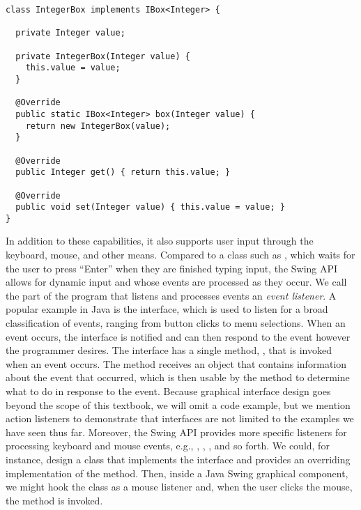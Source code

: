 \begin{lstlisting}[language=MyJava]
class IntegerBox implements IBox<Integer> {
  
  private Integer value;
  
  private IntegerBox(Integer value) { 
    this.value = value; 
  }
  
  @Override
  public static IBox<Integer> box(Integer value) { 
    return new IntegerBox(value); 
  }
  
  @Override
  public Integer get() { return this.value; }
  
  @Override
  public void set(Integer value) { this.value = value; }
}
\end{lstlisting}

In addition to these capabilities, it also supports user input through the keyboard, mouse, and other means. 
Compared to a class such as , which waits for the user to press ``Enter'' when they are finished typing input, the Swing API allows for dynamic input and whose events are processed as they occur.
We call the part of the program that listens and processes events an \emph{event listener}. 
A popular example in Java is the  interface, which is used to listen for a broad classification of events, ranging from button clicks to menu selections. 
When an event occurs, the  interface is notified and can then respond to the event however the programmer desires. 
The  interface has a single method, , that is invoked when an event occurs. 
The  method receives an  object that contains information about the event that occurred, which is then usable by the method to determine what to do in response to the event. 
Because graphical interface design goes beyond the scope of this textbook, we will omit a code example, but we mention action listeners to demonstrate that interfaces are not limited to the examples we have seen thus far. 
Moreover, the Swing API provides more specific listeners for processing keyboard and mouse events, e.g., , , , and so forth. 
We could, for instance, design a class that implements the  interface and provides an overriding implementation of the  method. 
Then, inside a Java Swing graphical component, we might hook the class as a mouse listener and, when the user clicks the mouse, the  method is invoked.

